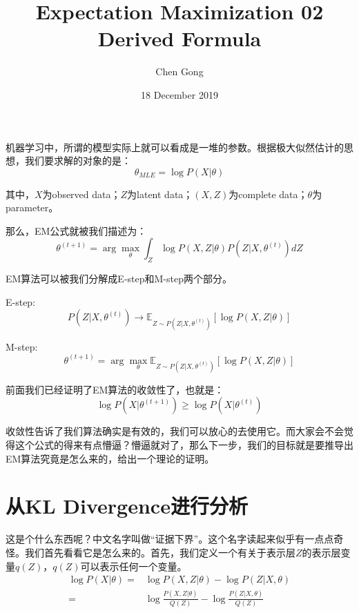 \documentclass[a4paper]{article}
\title{Expectation Maximization 02 Derived Formula}
\author{Chen Gong}
\date{18 December 2019}
\begin{document}
\maketitle
机器学习中，所谓的模型实际上就可以看成是一堆的参数。根据极大似然估计的思想，我们要求解的对象的是：
\begin{equation}
    \theta_{MLE} = \log P(X|\theta)
\end{equation}

其中，$X$为observed data；$Z$为latent data；$(X,Z)$为complete data；$\theta$为parameter。

那么，EM公式就被我们描述为：
\begin{equation}
\theta^{(t+1)} = \arg\max_{\theta} \int_Z \log P(X,Z|\theta)P(Z|X,\theta^{(t)}) dZ    
\end{equation}

EM算法可以被我们分解成E-step和M-step两个部分。

E-step:
\begin{equation}
    P(Z|X,\theta^{(t)}) \longrightarrow \mathbb{E}_{Z\sim P(Z|X,\theta^{(t)})}\left[ \log P(X,Z|\theta) \right]
\end{equation}

M-step:
\begin{equation}
    \theta^{(t+1)} = \arg\max_{\theta} \mathbb{E}_{Z\sim P(Z|X,\theta^{(t)})}\left[ \log P(X,Z|\theta) \right]
\end{equation}

前面我们已经证明了EM算法的收敛性了，也就是：
\begin{equation}
    \log P(X|\theta^{(t+1)}) \geq \log P(X|\theta^{(t)})
\end{equation}

收敛性告诉了我们算法确实是有效的，我们可以放心的去使用它。而大家会不会觉得这个公式的得来有点懵逼？懵逼就对了，那么下一步，我们的目标就是要推导出EM算法究竟是怎么来的，给出一个理论的证明。

\section{从KL Divergence进行分析}
这是个什么东西呢？中文名字叫做“证据下界”。这个名字读起来似乎有一点点奇怪。我们首先看看它是怎么来的。首先，我们定义一个有关于表示层$Z$的表示层变量$q(Z)$，$q(Z)$可以表示任何一个变量。
\begin{equation}
    \begin{split}
        \log P(X|\theta) 
        = & \log P(X,Z|\theta) - \log P(Z|X,\theta) \\
        = & \log \frac{P(X,Z|\theta)}{Q(Z)} - \log \frac{P(Z|X,\theta)}{Q(Z)} \\
    \end{split}
\end{equation}
\end{document}
